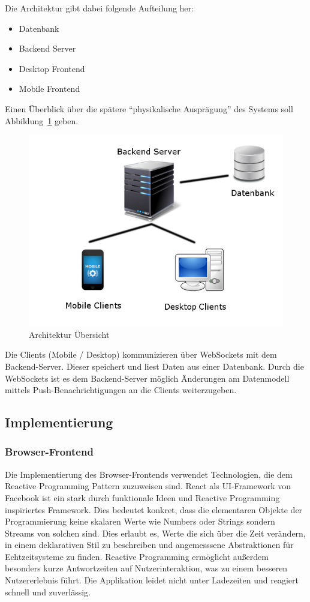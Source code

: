 Die Architektur gibt dabei folgende Aufteilung her:
\begin{itemize}
\item Datenbank
\item Backend Server
\item Desktop Frontend
\item Mobile Frontend
\end{itemize}
Einen Überblick über die spätere ``physikalische Ausprägung'' des
Systems soll Abbildung~\ref{fig:architektur} geben.
\begin{figure}[h]
\includegraphics[scale=0.5]{img/Architektur.png}
\caption{Architektur Übersicht\label{fig:architektur}}
\end{figure}
Die Clients (Mobile / Desktop) kommunizieren über WebSockets mit dem
Backend-Server. Dieser speichert und liest Daten aus einer Datenbank.
Durch die WebSockets ist es dem Backend-Server möglich Änderungen am
Datenmodell mittels Push-Benachrichtigungen an die Clients weiterzugeben.
\subsection{Implementierung}
\subsubsection{Browser-Frontend}
Die Implementierung des Browser-Frontends verwendet Technologien, die
dem \gls{Reactive Programming} Pattern zuzuweisen sind. \gls{React} als
UI-Framework von Facebook ist ein stark durch funktionale Ideen und
\gls{Reactive Programming} inspiriertes Framework. Dies bedeutet
konkret, dass die elementaren Objekte der Programmierung keine
skalaren Werte wie Numbers oder Strings sondern Streams von
solchen sind. Dies erlaubt es, Werte die sich über die Zeit verändern,
in einem deklarativen Stil zu beschreiben und angemesssene
Abstraktionen für Echtzeitsysteme zu finden. \gls{Reactive
  Programming} ermöglicht außerdem besonders kurze Antwortzeiten auf
Nutzerinteraktion, was zu einem besseren Nutzererlebnis führt. Die
Applikation leidet nicht unter Ladezeiten und reagiert schnell und
zuverlässig.

